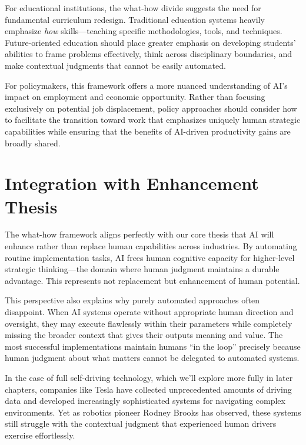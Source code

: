 \documentclass[
  Letterpaper,
]{scrbook}
\begin{document}
For educational institutions, the what-how divide suggests the need for
fundamental curriculum redesign. Traditional education systems heavily
emphasize \emph{how} skills---teaching specific methodologies, tools,
and techniques. Future-oriented education should place greater emphasis
on developing students' abilities to frame problems effectively, think
across disciplinary boundaries, and make contextual judgments that
cannot be easily automated.

For policymakers, this framework offers a more nuanced understanding of
AI's impact on employment and economic opportunity. Rather than focusing
exclusively on potential job displacement, policy approaches should
consider how to facilitate the transition toward work that emphasizes
uniquely human strategic capabilities while ensuring that the benefits
of AI-driven productivity gains are broadly shared.

\section{\texorpdfstring{Integration with
Enhancement
Thesis}{Integration with Enhancement Thesis}}\label{integration-with-enhancement-thesis}

The what-how framework aligns perfectly with our core thesis that AI
will enhance rather than replace human capabilities across industries.
By automating routine implementation tasks, AI frees human cognitive
capacity for higher-level strategic thinking---the domain where human
judgment maintains a durable advantage. This represents not replacement
but enhancement of human potential.

This perspective also explains why purely automated approaches often
disappoint. When AI systems operate without appropriate human direction
and oversight, they may execute flawlessly within their
parameters while completely missing the
broader context that gives their outputs meaning and value. The most
successful implementations maintain humans ``in the loop'' precisely
because human judgment about what matters cannot be delegated to
automated systems.

In the case of full self-driving technology, which we'll explore more
fully in later chapters, companies like Tesla
have collected unprecedented amounts of driving data and developed
increasingly sophisticated systems for navigating complex environments.
Yet as robotics pioneer Rodney Brooks has observed, these systems still
struggle with the contextual judgment that experienced human drivers
exercise effortlessly.
\end{document}
